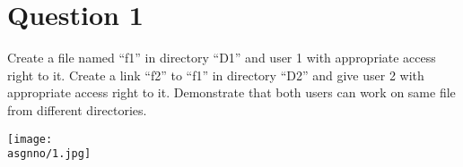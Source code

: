 \documentclass[main.tex]{subfiles}
\begin{document}
\section{Question 1}

Create a file named “f1” in directory “D1” and user 1 with appropriate access
right to it. Create a link “f2” to “f1” in directory “D2” and give user 2 with
appropriate access right to it. Demonstrate that both users can work on same
file from different directories.



\centering\texttt{[image: \\asgnno/1.jpg]}
\end{document}
